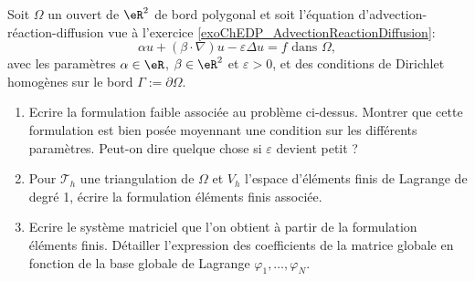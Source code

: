 \begin{exercice}\label{exoChMEF_AdvectionReactionDiffusion}

Soit $\Omega$ un ouvert de $\eR^2$ de bord polygonal et
soit l'équation d'advection-réaction-diffusion vue à l'exercice \ref{exoChEDP_AdvectionReactionDiffusion}:
\[
\alpha u + ( \beta \cdot \nabla ) u - \varepsilon \Delta u = f \mbox{ dans } \Omega,
\]
avec les paramètres $\alpha \in \eR$, $\beta \in \eR^2$ et $\varepsilon > 0$,
et des conditions de Dirichlet homogènes sur le bord $\Gamma := \partial \Omega$.

\begin{enumerate}

\item Ecrire la formulation faible associée au problème ci-dessus. Montrer que cette formulation est bien posée moyennant une condition sur les différents paramètres. Peut-on dire quelque chose si $\varepsilon$ devient petit ?

\item Pour $\mathcal{T}_h$ une triangulation de $\Omega$ et $V_h$ l'espace d'éléments finis de Lagrange de degré 1, écrire la formulation éléments finis associée.

\item Ecrire le système matriciel que l'on obtient à partir de la formulation éléments finis. Détailler l'expression des coefficients de la matrice globale en fonction de la base globale de Lagrange $\varphi_1,\ldots,\varphi_N$.

\end{enumerate}

\end{exercice}

\medskip

